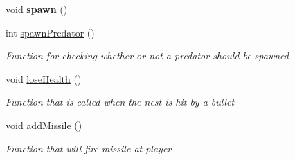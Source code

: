 \begin{DoxyCompactItemize}
\mbox{\label{class_nest_a58c91b9fd13c807c65116d36dcaa1887}} 
void {\bfseries spawn} ()
\item 
int \mbox{\hyperlink{class_nest_adba8d6d839eed2b6a6eaec600d2c52df}{spawn\+Predator}} ()
\begin{DoxyCompactList}\small\item\em Function for checking whether or not a predator should be spawned \end{DoxyCompactList}\item 
void \mbox{\hyperlink{class_nest_ab0943cc2a2ee21734835e0b909f5bdf5}{lose\+Health}} ()
\begin{DoxyCompactList}\small\item\em Function that is called when the nest is hit by a bullet \end{DoxyCompactList}\item 
void \mbox{\hyperlink{class_nest_a39ab7b5112b8d8951d61fb2c7d002a36}{add\+Missile}} ()
\begin{DoxyCompactList}\small\item\em Function that will fire missile at player \end{DoxyCompactList}\end{DoxyCompactItemize}
